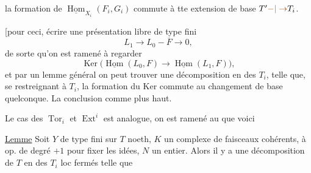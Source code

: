 la formation de $\underline{\operatorname{Hom}}_{X_i}(F_i,G_i)$ commute à tte extension de base $T'\unsure{-|\to}T_i$.

[pour ceci, écrire une  présentation libre de type fini
\[
L_1\longrightarrow L_0-\overline F\longrightarrow0,
\]
de sorte qu'on est ramené à regarder
\[
\operatorname{Ker}\bigl(\underline{\operatorname{Hom}}(L_0,F)\longrightarrow\underline{\operatorname{Hom}}(L_1,F)\bigr),
\]
et par un lemme général on peut trouver une décomposition  en des $T_i$, telle que, se restreignant à $T_i$, la formation du Ker commute au changement de base quelconque. La conclusion comme plus haut.


Le cas des $\operatorname{Tor}_i$ et $\operatorname{Ext}^i$ est analogue, on est ramené au  que voici

\uline{Lemme} Soit $Y$ de type fini sur $T$ noeth, $K$ un complexe de faisceaux cohérents, à op. de degré $+1$ pour fixer les idées, $N$ un entier. Alors il y a une décomposition de $T$ en des $T_i$ loc fermés  telle que
